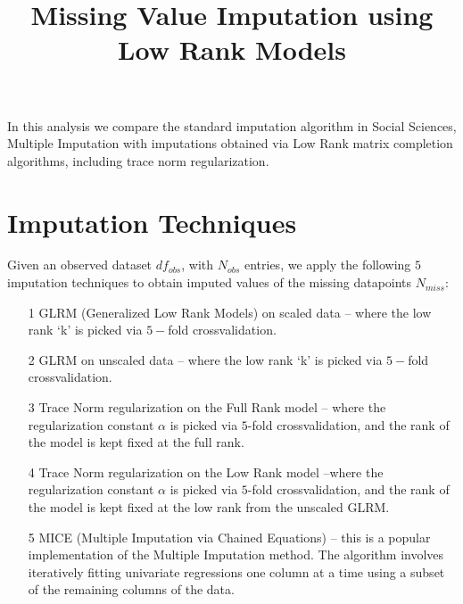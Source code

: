 \documentclass[11pt]{article} %
\begin{document}
\title{Missing Value Imputation using Low Rank Models}


\maketitle
\noindent
In this analysis we compare the standard imputation algorithm in Social Sciences, Multiple Imputation with imputations obtained via Low Rank matrix completion algorithms, including trace norm regularization. 
\section{Imputation Techniques}
Given an observed dataset $df_{obs}$, with $N_{obs}$ entries, we apply the following $5$ imputation techniques to obtain imputed values of the missing datapoints $N_{miss}$:
\begin{itemize}
\item[1] GLRM (Generalized Low Rank Models) on scaled data -- where the low rank `k' is picked via $5-$fold crossvalidation.   
\item[2] GLRM on unscaled data --  where the low rank `k' is picked via $5-$fold crossvalidation.   
\item[3] Trace Norm regularization on the Full Rank model -- where the regularization constant $\alpha$ is picked via $5$-fold crossvalidation, and the rank of the model is kept fixed at the full rank. 
\item[4] Trace Norm regularization on the Low Rank model --where the regularization constant $\alpha$ is picked via $5$-fold crossvalidation, and the rank of the model is kept fixed at the low rank from the unscaled GLRM. 
\item[5] MICE (Multiple Imputation via Chained Equations) -- this is a popular implementation of the Multiple Imputation method. The algorithm involves iteratively fitting univariate regressions one column at a time using a subset of the remaining columns of the data. 
\end{itemize} 
\end{document}
